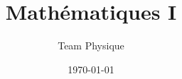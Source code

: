 \documentclass[xcolor=table]{beamer}
\title[Physique]{Mathématiques I} %
\author{Team Physique} %
\institute[S4S] %
{
Initiative Students4Students\\ %
\medskip
}
\date{\today} %
\begin{document}
\begin{frame}
\titlepage %
\end{frame}

    
    
\end{document}
